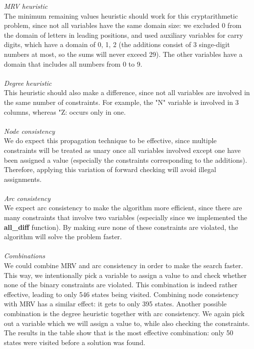 \documentclass{article}
\begin{document}
\textit{MRV heuristic}\\
The minimum remaining values heuristic should work for this cryptarithmetic problem, since not all variables have the same domain size: we excluded 0 from the domain of letters in leading positions, and used auxiliary variables for carry digits, which have a domain of {0, 1, 2} (the additions consist of 3 singe-digit numbers at most, so the sums will never exceed 29). The other variables have a domain that includes all numbers from 0 to 9.\\
\\
\textit{Degree heuristic}\\
This heuristic should also make a difference, since not all variables are involved in the same number of constraints. For example, the "N" variable is involved in 3 columns, whereas "Z: occurs only in one.\\
\\
\textit{Node consistency}\\
We do expect this propagation technique to be effective, since multiple constraints will be treated as unary once all variables involved except one have been assigned a value (especially the constraints corresponding to the additions). Therefore, applying this variation of forward checking will avoid illegal assignments. \\
\\
\textit{Arc consistency}\\
We expect arc consistency to make the algorithm more efficient, since there are many constraints that involve two variables (especially since we implemented the \textbf{all\_diff} function). By making sure none of these constraints are violated, the algorithm will solve the problem faster.\\
\\
\textit{Combinations}\\
We could combine MRV and arc consistency in order to make the search faster. This way, we intentionally pick a variable to assign a value to and check whether none of the binary constraints are violated. This combination is indeed rather effective, leading to only 546 states being visited. Combining node consistency with MRV has a similar effect: it gets to only 395 states.  Another possible combination is the degree heuristic together with arc consistency. We again pick out a variable which we will assign a value to, while also checking the constraints. The results in the table show that is the most effective combination: only 50 states were visited before a solution was found. \\
\\
\end{document}
